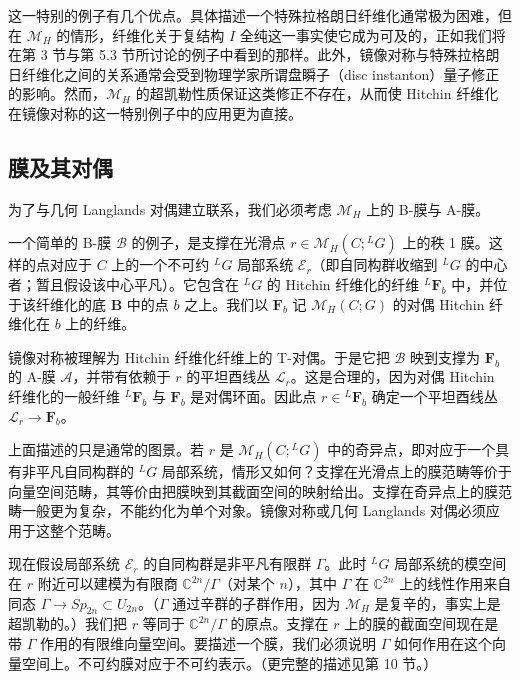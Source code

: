 这一特别的例子有几个优点。具体描述一个特殊拉格朗日纤维化通常极为困难，但在 $\mathcal{M}_H$ 的情形，纤维化关于复结构 $I$ 全纯这一事实使它成为可及的，正如我们将在第 3 节与第 5.3 节所讨论的例子中看到的那样。此外，镜像对称与特殊拉格朗日纤维化之间的关系通常会受到物理学家所谓盘瞬子（disc instanton）量子修正的影响。然而，$\mathcal{M}_H$ 的超凯勒性质保证这类修正不存在，从而使 Hitchin 纤维化在镜像对称的这一特别例子中的应用更为直接。

\subsection{膜及其对偶}

为了与几何 Langlands 对偶建立联系，我们必须考虑 $\mathcal{M}_H$ 上的 B-膜与 A-膜。

一个简单的 B-膜 $\mathcal{B}$ 的例子，是支撑在光滑点 $r\in\mathcal{M}_H(C;{}^{L}G)$ 上的秩 1 膜。这样的点对应于 $C$ 上的一个不可约 ${}^{L}G$ 局部系统 $\mathcal{E}_r$（即自同构群收缩到 ${}^{L}G$ 的中心者；暂且假设该中心平凡）。它包含在 ${}^{L}G$ 的 Hitchin 纤维化的纤维 ${}^{L}\boldsymbol{F}_b$ 中，并位于该纤维化的底 $\boldsymbol{B}$ 中的点 $b$ 之上。我们以 $\boldsymbol{F}_b$ 记 $\mathcal{M}_H(C;G)$ 的对偶 Hitchin 纤维化在 $b$ 上的纤维。


镜像对称被理解为 Hitchin 纤维化纤维上的 T-对偶。于是它把 $\mathcal{B}$ 映到支撑为 $\boldsymbol{F}_b$ 的 A-膜 $\mathcal{A}$，并带有依赖于 $r$ 的平坦酉线丛 $\mathcal{L}_r$。这是合理的，因为对偶 Hitchin 纤维化的一般纤维 ${}^{L}\boldsymbol{F}_b$ 与 $\boldsymbol{F}_b$ 是对偶环面。因此点 $r\in{}^{L}\boldsymbol{F}_b$ 确定一个平坦酉线丛 $\mathcal{L}_r\to\boldsymbol{F}_b$。

上面描述的只是通常的图景。若 $r$ 是 $\mathcal{M}_H(C;{}^{L}G)$ 中的奇异点，即对应于一个具有非平凡自同构群的 ${}^{L}G$ 局部系统，情形又如何？支撑在光滑点上的膜范畴等价于向量空间范畴，其等价由把膜映到其截面空间的映射给出。支撑在奇异点上的膜范畴一般更为复杂，不能约化为单个对象。镜像对称或几何 Langlands 对偶必须应用于这整个范畴。

现在假设局部系统 $\mathcal{E}_r$ 的自同构群是非平凡有限群 $\Gamma$。此时 ${}^{L}G$ 局部系统的模空间在 $r$ 附近可以建模为有限商 $\mathbb{C}^{2n}/\Gamma$（对某个 $n$），其中 $\Gamma$ 在 $\mathbb{C}^{2n}$ 上的线性作用来自同态 $\Gamma\to Sp_{2n}\subset U_{2n}$。（$\Gamma$ 通过辛群的子群作用，因为 $\mathcal{M}_H$ 是复辛的，事实上是超凯勒的。）我们把 $r$ 等同于 $\mathbb{C}^{2n}/\Gamma$ 的原点。支撑在 $r$ 上的膜的截面空间现在是带 $\Gamma$ 作用的有限维向量空间。要描述一个膜，我们必须说明 $\Gamma$ 如何作用在这个向量空间上。不可约膜对应于不可约表示。（更完整的描述见第 10 节。）

